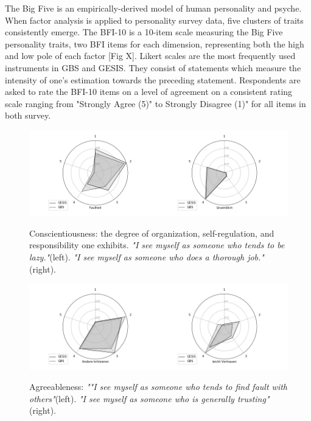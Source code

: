 The Big Five is an empirically-derived model of human personality and psyche. When factor analysis is applied to personality survey data, five clusters of traits consistently emerge. The BFI-10 is a 10-item scale measuring the Big Five personality traits, two BFI items for each dimension, representing both the high and low pole of each factor [Fig X]. Likert scales are the most frequently used instruments in GBS and GESIS. They consist of statements which measure the intensity of one's estimation towards the preceding statement. Respondents are asked to rate the BFI-10 items on a level of agreement on a consistent rating scale ranging from "Strongly Agree (5)" to Strongly Disagree (1)" for all items in both survey.

\begin{figure}[ht]
	\begin{center}
		\includegraphics[scale=0.56,angle=0]{fig/Conscientiousness_figure}
		\label{Conscientiousness}
		\caption{Conscientiousness: the degree of organization, self-regulation, and responsibility one exhibits. \textit{"I see myself as someone who tends to be lazy."}(left). \textit{"I see myself as someone who does a thorough job."}(right).}
	\end{center}
\end{figure}

                \begin{figure}[ht]
                \begin{center}
                   \includegraphics[scale=0.56,angle=0]{fig/Agreeablenessfigure}
	         \label{Agreeableness}
	         \caption{Agreeableness: \textit{""I see myself as someone who tends to find fault with others"}(left). \textit{"I see myself as someone who is generally trusting"}(right).}
                \end{center}
                \end{figure}

